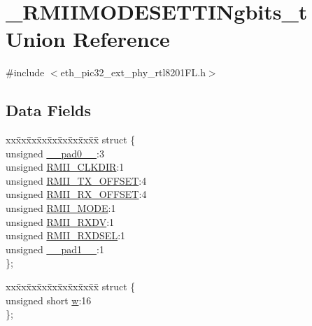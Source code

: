 \hypertarget{union___r_m_i_i_m_o_d_e_s_e_t_t_i_ngbits__t}{}\section{\+\_\+\+R\+M\+I\+I\+M\+O\+D\+E\+S\+E\+T\+T\+I\+Ngbits\+\_\+t Union Reference}
\label{union___r_m_i_i_m_o_d_e_s_e_t_t_i_ngbits__t}


{\ttfamily \#include $<$eth\+\_\+pic32\+\_\+ext\+\_\+phy\+\_\+rtl8201\+F\+L.\+h$>$}

\subsection*{Data Fields}
\begin{DoxyCompactItemize}
\item 
\begin{tabbing}
xx\=xx\=xx\=xx\=xx\=xx\=xx\=xx\=xx\=\kill
struct \{\\
\>unsigned \hyperlink{union___r_m_i_i_m_o_d_e_s_e_t_t_i_ngbits__t_adf71f3d8410c1f1dbbc96680a92c49af}{\_\_pad0\_\_}:3\\
\>unsigned \hyperlink{union___r_m_i_i_m_o_d_e_s_e_t_t_i_ngbits__t_ad17f117721db788c71870376a243a508}{RMII\_CLKDIR}:1\\
\>unsigned \hyperlink{union___r_m_i_i_m_o_d_e_s_e_t_t_i_ngbits__t_affaeee571946c827953af4cd20a48ecd}{RMII\_TX\_OFFSET}:4\\
\>unsigned \hyperlink{union___r_m_i_i_m_o_d_e_s_e_t_t_i_ngbits__t_aae467b09e6d6f08d6cbd6b7feeeb8406}{RMII\_RX\_OFFSET}:4\\
\>unsigned \hyperlink{union___r_m_i_i_m_o_d_e_s_e_t_t_i_ngbits__t_a20b8da6446fb0fd157b6fdeece4b4452}{RMII\_MODE}:1\\
\>unsigned \hyperlink{union___r_m_i_i_m_o_d_e_s_e_t_t_i_ngbits__t_abb141ef083a305a5f0f41c00802fd3b8}{RMII\_RXDV}:1\\
\>unsigned \hyperlink{union___r_m_i_i_m_o_d_e_s_e_t_t_i_ngbits__t_ad4f8a8b3ba12712dc52484e81625185f}{RMII\_RXDSEL}:1\\
\>unsigned \hyperlink{union___r_m_i_i_m_o_d_e_s_e_t_t_i_ngbits__t_acaf2d0924a107ec6e8d2e31febaf66f9}{\_\_pad1\_\_}:1\\
\}; \\

\end{tabbing}\item 
\begin{tabbing}
xx\=xx\=xx\=xx\=xx\=xx\=xx\=xx\=xx\=\kill
struct \{\\
\>unsigned short \hyperlink{union___r_m_i_i_m_o_d_e_s_e_t_t_i_ngbits__t_a160850a4684a3e82c2323033964f2e98}{w}:16\\
\}; \\

\end{tabbing}\end{DoxyCompactItemize}


